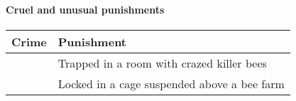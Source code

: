 
\paragraph{Cruel and unusual punishments}
\begin{tabular}{l l}
    Crime & Punishment \\
    \hline
    & Trapped in a room with crazed killer bees \\
    & Locked in a cage suspended above a bee farm \\
\end{tabular}
